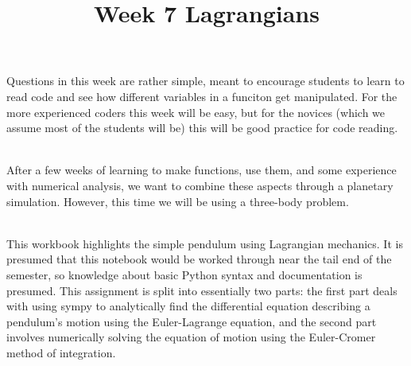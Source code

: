 \documentclass[12pt, letterpaper, twoside]{report}
\begin{document}
Questions in this week are rather simple, meant to encourage students to learn to read code and see how different variables in a funciton get manipulated. For the more experienced coders this week will be easy, but for the novices (which we assume most of the students will be) this will be good practice for code reading.

\newpage
\title{
	\large{Week 7}}\\

After a few weeks of learning to make functions, use them, and some experience with numerical analysis, we want to combine these aspects through a planetary simulation. However, this time we will be using a three-body problem.	
	

\newpage
\title{
    \large{Lagrangians}}\\

This workbook highlights the simple pendulum using Lagrangian mechanics. It is presumed that this notebook would be worked through near the tail end of the semester, so knowledge about basic Python syntax and documentation is presumed. This assignment is split into essentially two parts: the first part deals with using sympy to analytically find the differential equation describing a pendulum's motion using the Euler-Lagrange equation, and the second part involves numerically solving the equation of motion using the Euler-Cromer method of integration.
\end{document}
